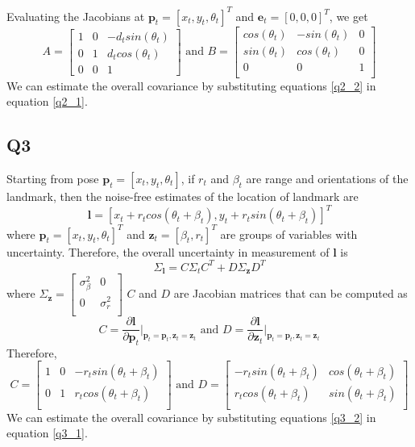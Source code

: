 \documentclass[12pt, a4paper]{article}
\begin{document}
Evaluating the Jacobians at $\mathbf{p}_t = [x_t, y_t, \theta_t]^T$ and $\mathbf{e}_t = [0, 0, 0]^T$, we get
\begin{equation}
  \label{q2_2}
A = \begin{bmatrix}
  1 & 0 & -d_tsin(\theta_t)\\
  0 & 1 & d_tcos(\theta_t)\\
  0 & 0 & 1
\end{bmatrix} \text{ and } B = \begin{bmatrix}
  cos(\theta_t) & -sin(\theta_t) & 0\\
  sin(\theta_t) & cos(\theta_t) & 0\\
  0  & 0 & 1\\
\end{bmatrix}
\end{equation}
We can estimate the overall covariance by substituting equations \ref{q2_2} in equation \ref{q2_1}.
\subsection{Q3}
Starting from pose $\mathbf{p}_t = \left[x_t, y_t, \theta_t\right]$, if $r_t$ and $\beta_t$ are range and orientations of the landmark, then the noise-free estimates of the location of landmark are
\begin{equation}
  \label{q3_0}
  \mathbf{l} = \left[x_t + r_tcos(\theta_t + \beta_t), y_t + r_tsin(\theta_t + \beta_t)\right]^T
\end{equation}
where $\mathbf{p}_t = [x_t, y_t, \theta_t]^T$ and $\mathbf{z}_t = [\beta_t, r_t]^T$ are groups of variables with uncertainty.
Therefore, the overall uncertainty in measurement of $\mathbf{l}$ is
\begin{equation}
  \label{q3_1}
  \Sigma_{\mathbf{l}} = C\Sigma_tC^T + D\Sigma_{\mathbf{z}}D^T
\end{equation}
  where $\Sigma_{\mathbf{z}} = \begin{bmatrix}
    \sigma_{\beta}^2 & 0\\
    0 & \sigma_r^2\\
  \end{bmatrix}$ $C$ and $D$ are Jacobian matrices that can be computed as
\[C = \frac{\partial \mathbf{l}}{\partial\mathbf{p}_t} \bigg\rvert_{\mathbf{p}_t=\mathbf{p}_t, \mathbf{z}_t=\mathbf{z}_t} \text{ and } D = \frac{\partial \mathbf{l}}{\partial\mathbf{z}_t} \bigg\rvert_{\mathbf{p}_t=\mathbf{p}_t, \mathbf{z}_t=\mathbf{z}_t}\]
Therefore,
\begin{equation}
  \label{q3_2}
C = \begin{bmatrix}
  1 & 0 & -r_tsin(\theta_t + \beta_t)\\
  0 & 1 & r_tcos(\theta_t + \beta_t)\\
\end{bmatrix} \text{ and } D = \begin{bmatrix}
  -r_tsin(\theta_t + \beta_t) & cos(\theta_t + \beta_t)\\
  r_tcos(\theta_t + \beta_t) & sin(\theta_t + \beta_t)\\
\end{bmatrix}
\end{equation}
We can estimate the overall covariance by substituting equations \ref{q3_2} in equation \ref{q3_1}.
\end{document}
